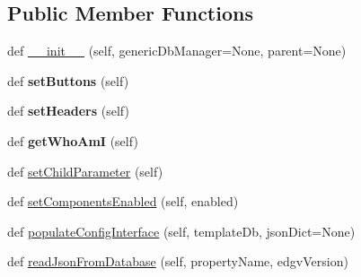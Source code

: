 \subsection*{Public Member Functions}
\begin{DoxyCompactItemize}
\item 
def \mbox{\hyperlink{class_dsg_tools_1_1_custom_widgets_1_1generic_manager_widget_1_1_generic_manager_widget_a5f5565d45d66a57f05a9dad0abd6c18a}{\+\_\+\+\_\+init\+\_\+\+\_\+}} (self, generic\+Db\+Manager=None, parent=None)
\item 
\mbox{\label{class_dsg_tools_1_1_custom_widgets_1_1generic_manager_widget_1_1_generic_manager_widget_ad928c87fcec1185678937434f7fa08bf}} 
def {\bfseries set\+Buttons} (self)
\item 
\mbox{\label{class_dsg_tools_1_1_custom_widgets_1_1generic_manager_widget_1_1_generic_manager_widget_aa888280b1a19dd03f3131dd530a507f6}} 
def {\bfseries set\+Headers} (self)
\item 
\mbox{\label{class_dsg_tools_1_1_custom_widgets_1_1generic_manager_widget_1_1_generic_manager_widget_a0d24c575bc03bcd17dbde53d8ec95eaa}} 
def {\bfseries get\+Who\+AmI} (self)
\item 
def \mbox{\hyperlink{class_dsg_tools_1_1_custom_widgets_1_1generic_manager_widget_1_1_generic_manager_widget_a9dc25b8a3d993af73650fb9420256030}{set\+Child\+Parameter}} (self)
\item 
def \mbox{\hyperlink{class_dsg_tools_1_1_custom_widgets_1_1generic_manager_widget_1_1_generic_manager_widget_af23713b1e8ad7e838c60c2c94109c026}{set\+Components\+Enabled}} (self, enabled)
\item 
def \mbox{\hyperlink{class_dsg_tools_1_1_custom_widgets_1_1generic_manager_widget_1_1_generic_manager_widget_ab68bb67376c927cd7f951ab2b0a52fd6}{populate\+Config\+Interface}} (self, template\+Db, json\+Dict=None)
\item 
def \mbox{\hyperlink{class_dsg_tools_1_1_custom_widgets_1_1generic_manager_widget_1_1_generic_manager_widget_a5215d77806621e6e57619d564f43c41b}{read\+Json\+From\+Database}} (self, property\+Name, edgv\+Version)
\item 

\end{DoxyCompactItemize}

